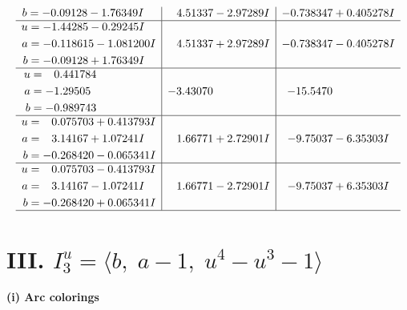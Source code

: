 \documentclass[1p]{elsarticle_modified}
\theoremstyle{definition}
\begin{document}
$$\begin{array}{c|c|c}
\begin{aligned}
b &= -0.09128 - 1.76349 I\end{aligned}
 & \phantom{-}4.51337 - 2.97289 I & -0.738347 + 0.405278 I \\ \hline\begin{aligned}
u &= -1.44285 - 0.29245 I \\
a &= -0.118615 - 1.081200 I \\
b &= -0.09128 + 1.76349 I\end{aligned}
 & \phantom{-}4.51337 + 2.97289 I & -0.738347 - 0.405278 I \\ \hline\begin{aligned}
u &= \phantom{-}0.441784\phantom{ +0.000000I} \\
a &= -1.29505\phantom{ +0.000000I} \\
b &= -0.989743\phantom{ +0.000000I}\end{aligned}
 & -3.43070\phantom{ +0.000000I} & -15.5470\phantom{ +0.000000I} \\ \hline\begin{aligned}
u &= \phantom{-}0.075703 + 0.413793 I \\
a &= \phantom{-}3.14167 + 1.07241 I \\
b &= -0.268420 - 0.065341 I\end{aligned}
 & \phantom{-}1.66771 + 2.72901 I & -9.75037 - 6.35303 I \\ \hline\begin{aligned}
u &= \phantom{-}0.075703 - 0.413793 I \\
a &= \phantom{-}3.14167 - 1.07241 I \\
b &= -0.268420 + 0.065341 I\end{aligned}
 & \phantom{-}1.66771 - 2.72901 I & -9.75037 + 6.35303 I\\
 \hline 
 \end{array}$$\newpage\newpage\renewcommand{\arraystretch}{1}
\centering \section*{III. $I^u_{3}= \langle b,\;a-1,\;u^4- u^3-1 \rangle$}
\flushleft \textbf{(i) Arc colorings}\\
\end{document}
